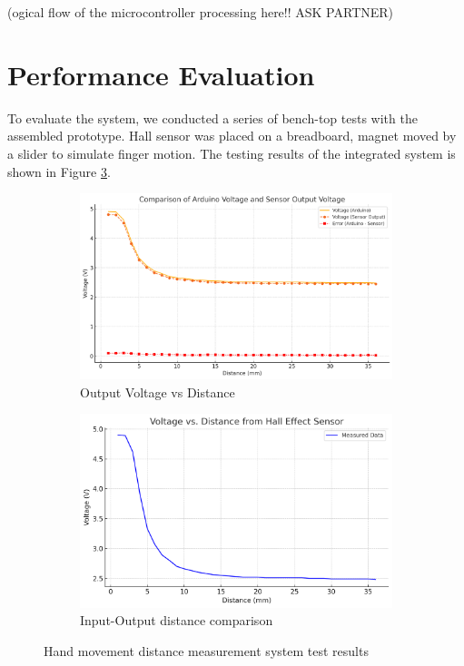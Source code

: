 \documentclass[a4paper,12pt]{article}
\begin{document}
(ogical flow of the microcontroller processing here!! ASK PARTNER)


%
\section{Performance Evaluation}
To evaluate the system, we conducted a series of bench-top tests with the assembled prototype. Hall sensor was placed on a breadboard, magnet moved by a slider to simulate finger motion. The testing results of the integrated system is shown in Figure \ref{fig:testres}. 
\begin{figure}[h]
\centering
\begin{subfigure}{0.5\textwidth}
  \centering
  \includegraphics[width=\linewidth]{distvsvoltX2.png}
  \caption{Output Voltage vs Distance}
  \label{fig:voltdist}
\end{subfigure}\hfill
\begin{subfigure}{0.5\textwidth}
  \centering
  \includegraphics[width=\linewidth]{distvsvolt.png}
  \caption{Input-Output distance comparison}
  \label{fig:distdit}
\end{subfigure}
\caption{Hand movement distance measurement system test results}
\label{fig:testres}
\end{figure}
\end{document}
